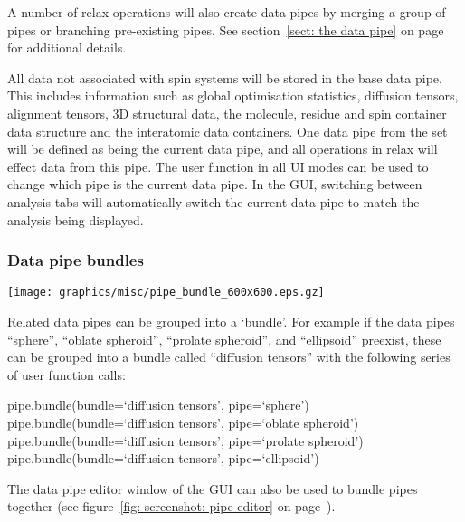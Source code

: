 
A number of relax operations will also create data pipes by merging a group of pipes or branching pre-existing pipes.  See section~\ref{sect: the data pipe} on page~\pageref{sect: the data pipe} for additional details.

All data not associated with spin systems will be stored in the base data pipe.  This includes information such as global optimisation statistics, diffusion tensors, alignment tensors, 3D structural data, the molecule, residue and spin container data structure and the interatomic data containers.  One data pipe from the set will be defined as being the current data pipe, and all operations in relax will effect data from this pipe.  The  user function in all UI modes can be used to change which pipe is the current data pipe.  In the GUI, switching between analysis tabs will automatically switch the current data pipe to match the analysis being displayed.


\subsubsection{Data pipe bundles}

\begin{figure*}[h]
\texttt{[image: graphics/misc/pipe\_bundle\_600x600.eps.gz]}
\end{figure*}

Related data pipes can be grouped into a `bundle'.  For example if the data pipes ``sphere'', ``oblate spheroid'', ``prolate spheroid'', and ``ellipsoid'' preexist, these can be grouped into a bundle called ``diffusion tensors'' with the following series of user function calls:

\begin{exampleenv}
pipe.bundle(bundle=`diffusion tensors', pipe=`sphere') \\
pipe.bundle(bundle=`diffusion tensors', pipe=`oblate spheroid') \\
pipe.bundle(bundle=`diffusion tensors', pipe=`prolate spheroid') \\
pipe.bundle(bundle=`diffusion tensors', pipe=`ellipsoid')
\end{exampleenv}

The data pipe editor window of the GUI can also be used to bundle pipes together (see figure~\ref{fig: screenshot: pipe editor} on page~\pageref{fig: screenshot: pipe editor}).



